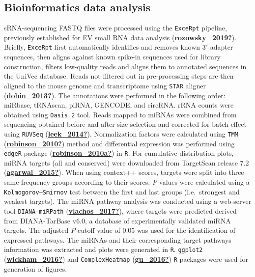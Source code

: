 \documentclass[12pt,twoside]{reedthesis}
\begin{document}
\hypertarget{bioinformatics-data-analysis}{%
\subsection{Bioinformatics data analysis}\label{bioinformatics-data-analysis}}

sRNA-sequencing FASTQ files were processed using the \texttt{ExceRpt} pipeline,
previously established for EV small RNA data analysis (\protect\hyperlink{ref-rozowsky_2019}{\textbf{rozowsky\_2019?}}).
Briefly, \texttt{ExceRpt} first automatically identifies and removes known 3\('\)
adapter sequences, then aligns against known spike-in sequences used for
library construction, filters low-quality reads and aligns them to
annotated sequences in the UniVec database. Reads not filtered out in
pre-processing steps are then aligned to the mouse genome and
transcriptome using \texttt{STAR} aligner (\protect\hyperlink{ref-dobin_2013}{\textbf{dobin\_2013?}}). The annotations were
performed in the following order: miRbase, tRNAscan, piRNA, GENCODE, and
circRNA. rRNA counts were obtained using \texttt{Oasis\ 2} tool. Reads mapped to
miRNAs were combined from sequencing obtained before and after
size-selection and corrected for batch effect using \texttt{RUVSeq}
(\protect\hyperlink{ref-leek_2014}{\textbf{leek\_2014?}}). Normalization factors were calculated using \texttt{TMM}
(\protect\hyperlink{ref-robinson_2010}{\textbf{robinson\_2010?}}) method and differential expression was performed using
\texttt{edgeR} package (\protect\hyperlink{ref-robinson_2010a}{\textbf{robinson\_2010a?}}) in \texttt{R}. For cumulative distribution
plots, miRNA targets (all and conserved) were downloaded from TargetScan
release 7.2 (\protect\hyperlink{ref-agarwal_2015}{\textbf{agarwal\_2015?}}). When using context++ scores, targets were
split into three same-frequency groups according to their scores.
\textit{P}-values were calculated using a \texttt{Kolmogorov–Smirnov} test
between the first and last groups (i.e.~strongest and weakest targets).
The miRNA pathway analysis was conducted using a web-server tool
\texttt{DIANA-miRPath} (\protect\hyperlink{ref-vlachos_2017}{\textbf{vlachos\_2017?}}), where targets were predicted-derived
from DIANA-TarBase v6.0, a database of experimentally validated miRNA
targets. The adjusted \textit{P} cutoff value of 0.05 was used for the
identification of expressed pathways. The miRNAs and their corresponding
target pathways information was extracted and plots were generated in
\texttt{R}. \texttt{ggplot2} (\protect\hyperlink{ref-wickham_2016}{\textbf{wickham\_2016?}}) and \texttt{ComplexHeatmap} (\protect\hyperlink{ref-gu_2016}{\textbf{gu\_2016?}}) \texttt{R}
packages were used for generation of figures.
\end{document}
